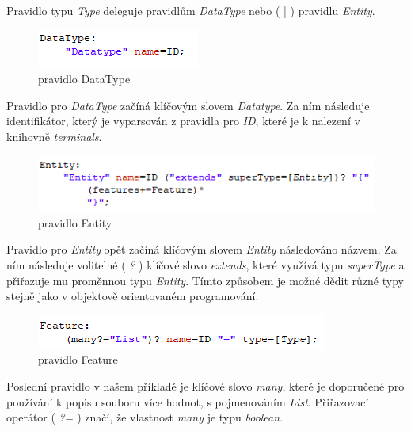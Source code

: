 Pravidlo typu \textit{Type} deleguje pravidlům \textit{DataType} nebo ( | ) pravidlu \textit{Entity}.

\begin{figure}[H]
	\centering
	\includegraphics[width=0.4\linewidth]{images/xtext/dataType}
	\caption{pravidlo DataType}
\end{figure}

Pravidlo pro \textit{DataType} začíná klíčovým slovem \textit{Datatype}. Za ním následuje identifikátor, který je vyparsován z pravidla pro \textit{ID}, které je k nalezení v knihovně \textit{terminals}.

\begin{figure}[H]
	\centering
	\includegraphics[width=0.8\linewidth]{images/xtext/entity}
	\caption{pravidlo Entity}
\end{figure}

Pravidlo pro \textit{Entity} opět začíná klíčovým slovem \textit{Entity} následováno názvem. Za ním následuje volitelné ( \textit{?} ) klíčové slovo \textit{extends}, které využívá typu \textit{superType} a přiřazuje mu proměnnou typu \textit{Entity}. Tímto způsobem je možné dědit různé typy stejně jako v objektově orientovaném programování.

\begin{figure}[H]
	\centering
	\includegraphics[width=0.7\linewidth]{images/xtext/feature}
	\caption{pravidlo Feature}
\end{figure}

Poslední pravidlo v našem příkladě je klíčové slovo \textit{many}, které je doporučené pro používání k popisu souboru více hodnot, s pojmenováním \textit{List}. Přiřazovací operátor ( \textit{?=} ) značí, že vlastnost \textit{many} je typu \textit{boolean}.

